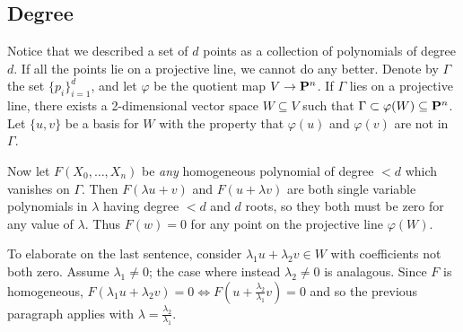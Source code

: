 \subsection{Degree}
Notice that we described a set of $d$ points as a collection of polynomials of degree $d$. If all the points lie on a projective line, we cannot do any better. Denote by $\Gamma$ the set $\{p_i\}_{i=1}^d$, and let $\varphi$ be the quotient map $V\to\P^n$. If $\Gamma$ lies on a projective line, there exists a 2-dimensional vector space $W\subseteq V$ such that $\Gamma\subset\varphi(W)\subseteq\P^n$. Let $\{u, v\}$ be a basis for $W$ with the property that $\varphi(u)$ and $\varphi(v)$ are not in $\Gamma$.

Now let $F(X_0,\ldots,X_n)$ be \emph{any} homogeneous polynomial of degree $< d$ which vanishes on $\Gamma$. Then $F(\lambda u + v)$ and $F(u + \lambda v)$ are both single variable polynomials in $\lambda$ having degree $< d$ and $d$ roots, so they both must be zero for any value of $\lambda$. Thus $F(w)=0$ for any point on the projective line $\varphi(W)$.

To elaborate on the last sentence, consider $\lambda_1 u + \lambda_2 v\in W$ with coefficients not both zero. Assume $\lambda_1\neq 0$; the case where instead $\lambda_2\neq 0$ is analagous. Since $F$ is homogeneous, $F(\lambda_1 u + \lambda_2 v)= 0\iff F(u+\frac{\lambda_2}{\lambda_1}v)=0$ and so the previous paragraph applies with $\lambda = \frac{\lambda_2}{\lambda_1}$.



